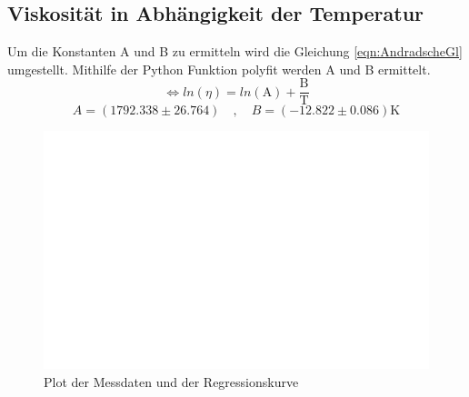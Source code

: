 \subsection{Viskosität in Abhängigkeit der Temperatur}
Um die Konstanten A und B zu ermitteln wird die Gleichung \eqref{eqn:AndradscheGl} umgestellt.
Mithilfe der Python Funktion polyfit werden A und B ermittelt.
\begin{equation}
  \Leftrightarrow ln(η) = ln(\text{A}) + \frac{\text{B}}{\text{T}}
\end{equation}
\begin{equation}
  A = (1792.338 ± 26.764) \quad , \quad B = (-12.822 ± 0.086)\si{\kelvin}
\end{equation}
\begin{figure}[H]
  \centering
  \includegraphics[width=1\textwidth]{build/plot.pdf}
  \caption{Plot der Messdaten und der Regressionskurve\protect\footnotemark}
  \label{fig:plot}
\end{figure}

